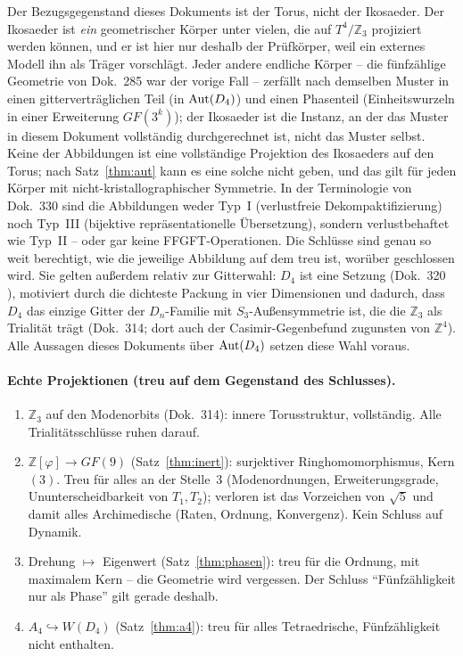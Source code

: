 Der Bezugsgegenstand dieses Dokuments ist der Torus, nicht der Ikosaeder.
Der Ikosaeder ist \emph{ein} geometrischer Körper unter vielen, die auf
$T^4/\mathbb{Z}_3$ projiziert werden können, und er ist hier nur deshalb
der Prüfkörper, weil ein externes Modell ihn als Träger vorschlägt. Jeder
andere endliche Körper -- die fünfzählige Geometrie von Dok.~285 war der
vorige Fall -- zerfällt nach demselben Muster in einen gitterverträglichen
Teil (in ${\rm Aut}(D_4)$) und einen Phasenteil (Einheitswurzeln in einer
Erweiterung $GF(3^k)$); der Ikosaeder ist die Instanz, an der das Muster
in diesem Dokument vollständig durchgerechnet ist, nicht das Muster
selbst. Keine der Abbildungen ist eine vollständige Projektion des
Ikosaeders auf den Torus; nach Satz~\ref{thm:aut} kann es eine solche
nicht geben, und das gilt für jeden Körper mit nicht-kristallographischer
Symmetrie. In der Terminologie von Dok.~330 sind die Abbildungen weder
Typ~I (verlustfreie Dekompaktifizierung) noch Typ~III (bijektive
repräsentationelle Übersetzung), sondern verlustbehaftet wie Typ~II --
oder gar keine FFGFT-Operationen. Die Schlüsse sind genau so weit
berechtigt, wie die jeweilige Abbildung auf dem treu ist, worüber
geschlossen wird. Sie gelten außerdem relativ zur Gitterwahl: $D_4$ ist
eine Setzung (Dok.~320 \SetzM), motiviert durch die dichteste Packung
in vier Dimensionen und dadurch, dass $D_4$ das einzige Gitter der
$D_n$-Familie mit $S_3$-Außensymmetrie ist, die die $\mathbb{Z}_3$ als
Trialität trägt (Dok.~314; dort auch der Casimir-Gegenbefund zugunsten
von $\mathbb{Z}^4$). Alle Aussagen dieses Dokuments über ${\rm Aut}(D_4)$
setzen diese Wahl voraus.

\paragraph{Echte Projektionen (treu auf dem Gegenstand des Schlusses).}
\begin{enumerate}[nosep]
\item $\mathbb{Z}_3$ auf den Modenorbits (Dok.~314): innere Torusstruktur,
      vollständig. Alle Trialitätsschlüsse ruhen darauf.
\item $\mathbb{Z}[\varphi]\to GF(9)$ (Satz~\ref{thm:inert}): surjektiver
      Ringhomomorphismus, Kern $(3)$. Treu für alles an der Stelle~3
      (Modenordnungen, Erweiterungsgrade, Ununterscheidbarkeit von
      $T_1,T_2$); verloren ist das Vorzeichen von $\sqrt5$ und damit alles
      Archimedische (Raten, Ordnung, Konvergenz). Kein Schluss auf Dynamik.
\item Drehung $\mapsto$ Eigenwert (Satz~\ref{thm:phasen}): treu für die
      Ordnung, mit maximalem Kern -- die Geometrie wird vergessen. Der
      Schluss \enquote{Fünfzähligkeit nur als Phase} gilt gerade deshalb.
\item $A_4\hookrightarrow W(D_4)$ (Satz~\ref{thm:a4}): treu für alles
      Tetraedrische, Fünfzähligkeit nicht enthalten.
\end{enumerate}

